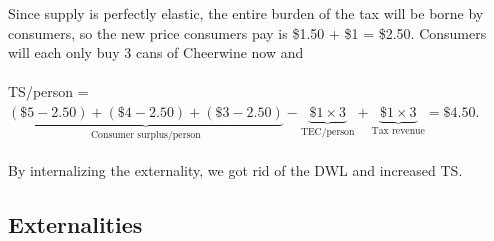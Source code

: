 \documentclass[addpoints,11pt]{exam}
\theoremstyle{definition}
\begin{document}
\begin{questions}
\begin{parts}
		\begin{solution}
			Since supply is perfectly elastic, the entire burden of the tax will be borne by consumers, so the new price consumers pay is \$1.50 + \$1 = \$2.50. Consumers will each only buy 3 cans of Cheerwine now and \\\\
			TS/person = $\underbrace{(\$5 - 2.50) + (\$4 - 2.50) + (\$3 - 2.50)}_{\text{Consumer surplus/person}} - \underbrace{\$1 \times 3}_{\text{TEC/person}} + \underbrace{\$1 \times 3}_{\text{Tax revenue}} = \$4.50$.\\\\
			By internalizing the externality, we got rid of the DWL and increased TS.
		\end{solution}
	
	\end{parts}
		
\end{questions}

\subsection*{Externalities}
\end{document}
